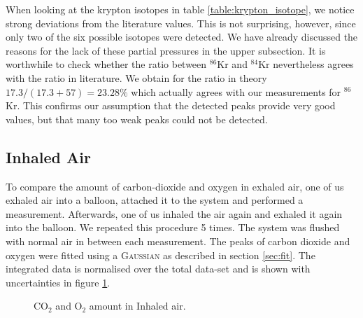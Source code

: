    When looking at the krypton isotopes in table \ref{table:krypton_isotope}, we notice strong deviations from the literature values. This is not surprising, however, since only two of the six possible isotopes were detected. We have already discussed the reasons for the lack of these partial pressures in the upper subsection.  It is worthwhile to check whether the ratio between $^{86}$Kr and $^{84}$Kr nevertheless agrees with the ratio in literature. We obtain for the ratio in theory $17.3/(17.3+57) = 23.28 \%$ which actually agrees with our measurements for $^{86}$Kr. This confirms our assumption that the detected peaks provide very good values, but that many too weak peaks could not be detected.
 


    \newpage

    \subsection{Inhaled Air}
    To compare the amount of carbon-dioxide and oxygen in exhaled air, one of us exhaled air into a balloon, attached it to the system and performed a measurement. Afterwards, one of us inhaled the air again and exhaled it again into the balloon. We repeated this procedure 5 times. The system was flushed with normal air in between each measurement. The peaks of carbon dioxide and oxygen were fitted using a {\scshape Gaussian} as described in section \ref{sec:fit}. The integrated data is normalised over the total data-set and is shown with uncertainties in figure \ref{fig:air}. 

    \begin{figure}[h]
            \centering
            \quad
            \quad
            \caption{CO$_2$ and O$_2$ amount in Inhaled air.}
         \label{fig:air}
    \end{figure}
    
